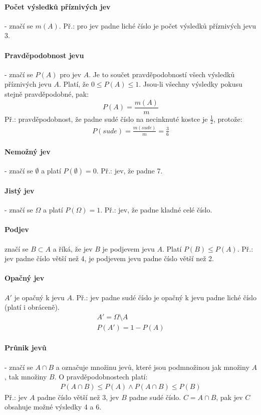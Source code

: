 \documentclass[12pt]{article}
\begin{document}
\paragraph{Počet výsledků příznivých jev} - značí se $m(A)$. Př.: pro jev padne liché číslo je počet výsledků příznivých jevu 3.
\paragraph{Pravděpodobnost jevu} - značí se $P(A)$ pro jev $A$. Je to součet pravděpodobností všech výsledků příznivých jevu $A$. Platí, že $0 \leq P(A) \leq 1$. Jsou-li všechny výsledky pokusu stejně pravděpodobné, pak:
\begin{equation}
P(A) = \frac{m(A)}{m}
\end{equation}
Př.: pravděpodobnost, že padne sudé číslo na necinknuté kostce je $\frac{1}{2}$, protože:
\begin{align*}
P(sude) = \frac{m(sude)}{m} = \frac{3}{6}
\end{align*}
\paragraph{Nemožný jev} - značí se $\emptyset$ a platí $P(\emptyset) = 0$. Př.: jev, že padne 7.
\paragraph{Jistý jev} - značí se $\Omega$ a platí $P(\Omega) =1$. Př.: jev, že padne kladné celé číslo.
\paragraph{Podjev} značí se $B \subset A$ a říká, že jev $B$ je podjevem jevu $A$. Platí $P(B) \leq P(A)$. Př.: jev padne číslo větší než 4, je podjevem jevu padne číslo větší než 2.
\paragraph{Opačný jev} $A'$ je opačný k jevu $A$. Př.: jev padne sudé číslo je opačný k jevu padne liché číslo (platí i obráceně).
\begin{align}
A' = \Omega \setminus A\\
P(A') = 1 - P(A)
\end{align}
\paragraph{Průnik jevů} - značí se $A\cap B$ a označuje množinu jevů, které jsou podmnožinou jak množiny $A$, tak množiny $B$. O pravděpodobnostech platí:
\begin{align*}
P(A\cap B) \leq P(A) \land P(A\cap B) \leq P(B)
\end{align*}
Př.: jev $A$ padne číslo větší než 3, jev $B$ padne sudé číslo. $C= A \cap B$, pak jev $C$ obsahuje možné výsledky 4 a 6.
\end{document}

